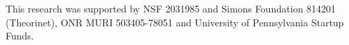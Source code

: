 \documentclass{article}
\theoremstyle{plain}
\theoremstyle{definition}
\theoremstyle{remark}
\begin{document}
\begin{ack}
    This research was supported by NSF 2031985 and Simons Foundation 814201 (Theorinet), ONR MURI 503405-78051 and University of Pennsylvania Startup Funds.
\end{ack}

















\end{document}
